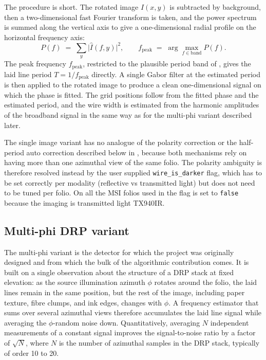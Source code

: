 The procedure is short. The rotated image $I(x,y)$ is
subtracted by background, then a two-dimensional fast Fourier transform is
taken, and the power spectrum is summed along the
vertical axis to give a one-dimensional radial profile on the
horizontal frequency axis:
\begin{equation}
  P(f) \;=\; \sum_y \bigl| \hat{I}(f, y) \bigr|^{2} ,
  \qquad
  f_{\mathrm{peak}} \;=\; \arg\max_{f \in \text{band}} P(f) .
  \label{eq:radial_fft}
\end{equation}
The peak frequency $f_{\mathrm{peak}}$, restricted to the
plausible period band of , gives the
laid line period $T = 1/f_{\mathrm{peak}}$ directly. A single Gabor
filter at the estimated period is then applied to
the rotated image to produce a clean one-dimensional signal on
which the phase is fitted. The grid positions follow from the
fitted phase and the estimated period, and the wire width is
estimated from the harmonic amplitudes of the broadband signal in
the same way as for the multi-phi variant described later.

The single image variant has no analogue of the polarity
correction or the half-period auto correction described below in
, because both
mechanisms rely on having more than one azimuthal view of the same
folio. The polarity ambiguity is therefore resolved instead by the
user supplied \texttt{wire\_is\_darker} flag, which has to be set
correctly per modality (reflective vs transmitted light) but does
not need to be tuned per folio. On all the MSI folios used in
 the flag is set to \texttt{false}
because the imaging is transmitted light TX940IR.

\subsection{Multi-phi DRP variant}
\label{sec:multiphi:multi}

The multi-phi variant is the detector for which the project was
originally designed and from which the bulk of the algorithmic
contribution comes. It is built on a single observation about the
structure of a DRP stack at fixed elevation: as the source illumination
azimuth $\phi$ rotates around the folio, the laid lines remain in
the same position, but the rest of the image, including paper texture,
fibre clumps, and ink edges, changes with $\phi$. A frequency
estimator that sums over several azimuthal views therefore
accumulates the laid line signal while averaging the
$\phi$-random noise down. Quantitatively, averaging $N$
independent measurements of a constant signal improves the
signal-to-noise ratio by a factor of $\sqrt{N}$, where $N$ is the
number of azimuthal samples in the DRP stack, typically of order
10 to 20.

